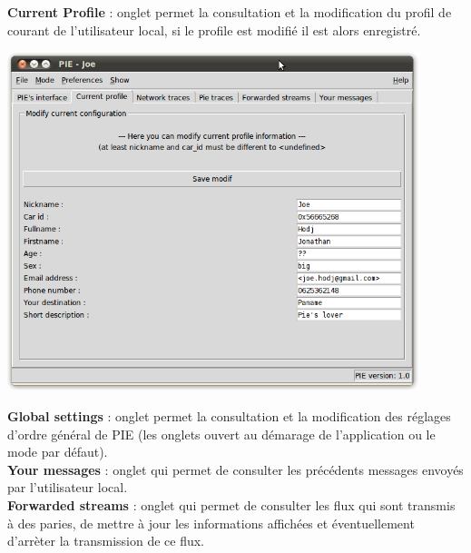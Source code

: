 \clearpage
\textbf{Current Profile} : onglet permet la consultation et la modification du profil de
courant de l'utilisateur local, si le profile est modifié il est alors enregistré. \\

\begin{center}
    \includegraphics[width=0.9\textwidth]{img/profile.png}
\end{center}

\textbf{Global settings} : onglet permet la consultation et la modification des réglages 
d'ordre général de PIE (les onglets ouvert au démarage de l'application ou le mode par défaut). \\

\textbf{Your messages} : onglet qui permet de consulter les précédents messages envoyés par l'utilisateur local. \\

\textbf{Forwarded streams} : onglet qui permet de consulter les flux qui sont transmis à des paries, de mettre à jour 
les informations affichées et éventuellement d'arrèter la transmission de ce flux.\\

